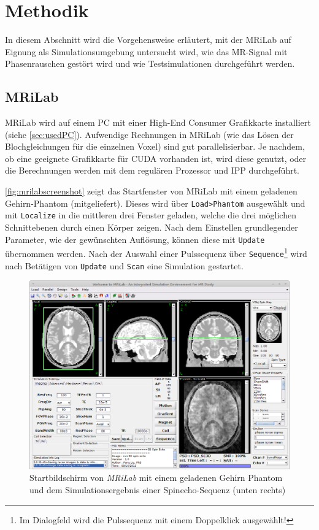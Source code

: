 \chapter{Methodik}
In diesem Abschnitt wird die Vorgehensweise erläutert, mit der MRiLab auf Eignung als Simulationsumgebung untersucht wird, wie das MR-Signal mit Phasenrauschen gestört wird und wie Testsimulationen durchgeführt werden.

\section{MRiLab}
MRiLab wird auf einem PC mit einer High-End Consumer Grafikkarte installiert (siehe \autoref{sec:usedPC}). Aufwendige Rechnungen in MRiLab (wie das Lösen der Blochgleichungen für die einzelnen Voxel) sind gut parallelisierbar. Je nachdem, ob eine geeignete Grafikkarte für CUDA vorhanden ist, wird diese genutzt, oder die Berechnungen werden mit dem regulären Prozessor und IPP durchgeführt.

\autoref{fig:mrilabscreenshot} zeigt das Startfenster von MRiLab mit einem geladenen Gehirn-Phantom (mitgeliefert). Dieses wird über \texttt{Load>Phantom} ausgewählt und mit \texttt{Localize} in die mittleren drei Fenster geladen, welche die drei möglichen Schnittebenen durch einen Körper zeigen. Nach dem Einstellen grundlegender Parameter, wie der gewünschten Auflösung, können diese mit \texttt{Update} übernommen werden. Nach der Auswahl einer Pulssequenz über \texttt{Sequence}\footnote{Im Dialogfeld wird die Pulssequenz mit einem Doppelklick ausgewählt!} wird nach Betätigen von \texttt{Update} und \texttt{Scan} eine Simulation gestartet.

\begin{figure}[H]
	\centering
	\includegraphics[width=\textwidth]{img/mrilabScreenshot.png}
	\caption[MRiLab Startbildschirm]{Startbildschirm von \textit{MRiLab} mit einem geladenen Gehirn Phantom und dem Simulationsergebnis einer Spinecho-Sequenz (unten rechts)}
	\label{fig:mrilabscreenshot}
\end{figure}

